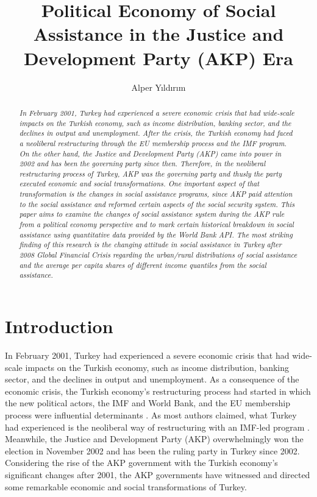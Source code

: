 \documentclass[11pt]{article}
\title{Political Economy of Social Assistance in the Justice and Development Party (AKP) Era}
\author{Alper Yıldırım}
\date{}
\begin{document}
\maketitle

\begin{abstract}
\textit{In February 2001, Turkey had experienced a severe economic crisis that had wide-scale impacts on the Turkish economy, such as income distribution, banking sector, and the declines in output and unemployment. After the crisis, the Turkish economy had faced a neoliberal restructuring through the EU membership process and the IMF program. On the other hand, the Justice and Development Party (AKP) came into power in 2002 and has been the governing party since then. Therefore, in the neoliberal restructuring process of Turkey, AKP was the governing party and thusly the party executed economic and social transformations. One important aspect of that transformation is the changes in social assistance programs, since AKP paid attention to the social assistance and reformed certain aspects of the social security system. This paper aims to examine the changes of social assistance system during the AKP rule from a political economy perspective and to mark certain historical breakdown in social assistance using quantitative data provided by the World Bank API. The most striking finding of this research is the changing attitude in social assistance in Turkey after 2008 Global Financial Crisis regarding the urban/rural distributions of social assistance and the average per capita shares of different income quantiles from the social assistance.}

\end{abstract}

\section{Introduction}

In February 2001, Turkey had experienced a severe economic crisis that had wide-scale impacts on the Turkish economy, such as income distribution, banking sector, and the declines in output and unemployment. As a consequence of the economic crisis, the Turkish economy’s restructuring process had started in which the new political actors, the IMF and World Bank, and the EU membership process were influential determinants \cite{onics2009beyond}. As most authors claimed, what Turkey had experienced is the neoliberal way of restructuring with an IMF-led program \cite{yeldan2006neoliberal}. Meanwhile, the Justice and Development Party (AKP) overwhelmingly won the election in November 2002 and has been the ruling party in Turkey since 2002. Considering the rise of the AKP government with the Turkish economy’s significant changes after 2001, the AKP governments have witnessed and directed some remarkable economic and social transformations of Turkey. \\
\end{document}
